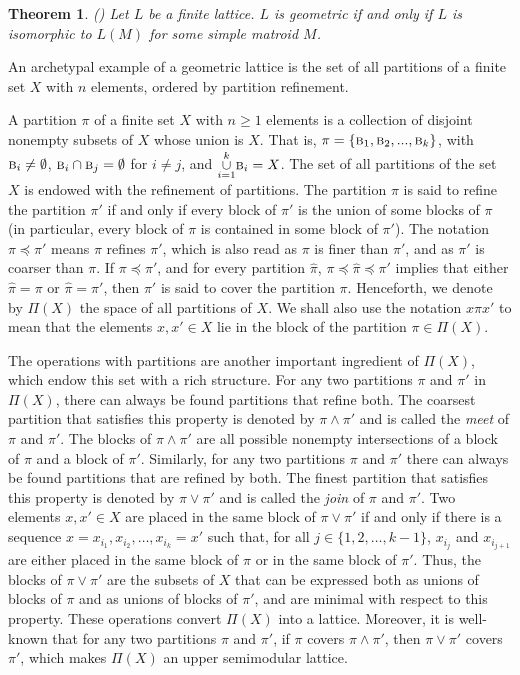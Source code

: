 \documentclass[12pt]{extarticle}
\newtheorem{Theorem}{Theorem}
\begin{document}
	\begin{Theorem} (\cite{StanleyHA}) Let $L$ be a finite lattice. $L$ is geometric if and only if $L$ is isomorphic to $L(M)$ for some simple matroid $M$.
	\end{Theorem}
	
	An archetypal example of a geometric lattice is the set of all partitions of a finite set \(X\) with \(n\) elements, ordered by partition refinement. 
	
	A partition $\pi$ of a finite set $X$ with $n\geq 1$ elements is a collection of disjoint nonempty subsets of $X$ whose union is $X$. That is, $\pi = \{ \textsc{b}_{1}, \textsc{b}_{2},..., \textsc{b}_{k}\}$, with $\textsc{b}_{i} \neq \emptyset$, $\textsc{b}_{i} \cap \textsc{b}_{j} = \emptyset$ for $i \neq j$, and $\underset{i = 1}{\overset{k}{\cup}} \textsc{b}_{i} = X$. The set of all partitions of the set $X$ is endowed with the refinement of partitions. The partition $\pi$ is said to refine the partition $\pi'$ if and only if every block of $\pi'$ is the union of some blocks of $\pi$ (in particular, every block of $\pi$ is contained in some block of $\pi'$). The notation $\pi\preceq\pi'$ means $\pi$ refines $\pi'$, which is also read as $\pi$ is finer than $\pi'$, and as $\pi'$ is coarser than $\pi$. If $\pi\preceq\pi'$, and for every partition $\hat{\pi}$, $\pi\preceq\hat{\pi}\preceq \pi'$ implies that either $\hat{\pi}=\pi$ or $\hat{\pi}=\pi'$, then $\pi'$ is said to cover the partition $\pi$. Henceforth, we denote by $\Pi(X)$ the space of all partitions of $X$. We shall also use the notation $x\pi x'$ to mean that the elements $x,x'\in X$ lie in the block of the partition $\pi\in\Pi(X)$.
	
	The operations with partitions are another important ingredient of $\Pi(X)$, which endow this set with a rich structure. For any two partitions $\pi$ and $\pi'$ in $\Pi(X)$, there can always be found partitions that refine both. The coarsest partition that satisfies this property is denoted by $\pi\wedge \pi'$ and is called the \emph{meet} of $\pi$ and $\pi'$. The blocks of $\pi\wedge\pi'$ are all possible nonempty intersections of a block of $\pi$ and a block of $\pi'$. Similarly, 
	for any two partitions $\pi$ and $\pi'$ there can always be found partitions that are refined by both. The finest partition that satisfies this property is denoted by $\pi\vee \pi'$ and is called the \emph{join} of $\pi$ and $\pi'$. Two elements $x,x'\in X$ are placed in the same block of $\pi\vee\pi'$ if and only if there is a sequence $x=x_{i_1}, x_{i_2}, \ldots, x_{i_k}=x'$ such that, for all $j\in\{1,2,\ldots,k-1\}$, $x_{i_j}$ and $x_{i_{j+1}}$ are either placed in the same block of $\pi$ or in the same block of $\pi'$. Thus, the blocks of $\pi\vee\pi'$ are the subsets of $X$ that can be expressed both as unions of blocks of $\pi$ and as unions of blocks of $\pi'$, and are minimal with respect to this property. These operations convert $\Pi(X)$ into a lattice. Moreover, it is well-known that for any two partitions $\pi$ and $\pi'$, if $\pi$ covers $\pi\wedge\pi'$, then $\pi\vee\pi'$ covers $\pi'$, which makes $\Pi(X)$ an upper semimodular lattice.
	
\end{document}

